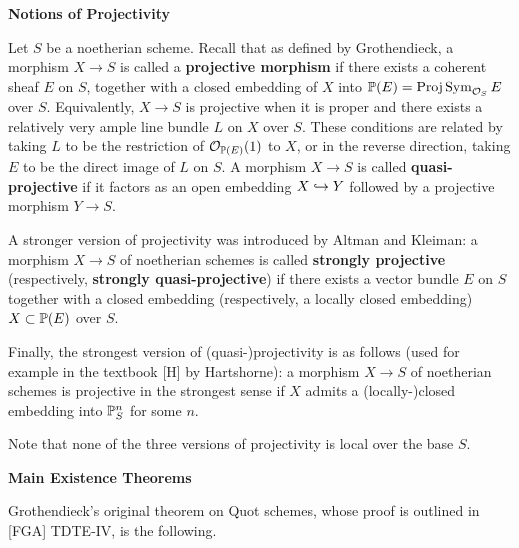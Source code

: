 
\medskip



\centerline{\large\bf Notions of Projectivity}

\medskip


\begin{definition}\label{nhq-projectivity-notions}
Let $S$ be a noetherian scheme. Recall that as defined by Grothendieck,
a morphism $X\to S$ is called a \textbf{projective morphism}
if there exists a coherent sheaf $E$ on $S$, together with a
closed embedding of $X$ into $\mathbb{P}(E) = \operatorname{Proj} \operatorname{Sym}_{{\mathcal O}_S} E $
over $S$. Equivalently, $X\to S$ is projective when
it is proper and there exists a relatively very ample
line bundle $L$ on $X$ over $S$. These conditions are related by
taking $L$ to be the restriction of ${\mathcal O}_{\mathbb{P}(E)}(1)$ to $X$, or
in the reverse direction, taking $E$ to be the direct image of $L$ on $S$.
A morphism $X\to S$ is called \textbf{quasi-projective} if it factors as
an open embedding $X\hookrightarrow Y$ followed by a projective morphism $Y \to S$.


A stronger version of projectivity was introduced
by Altman and Kleiman: a morphism
$X\to S$ of noetherian schemes is called \textbf{strongly projective}
(respectively, \textbf{strongly quasi-projective}) if
there exists a vector bundle $E$ on $S$ together with a closed
embedding (respectively, a locally closed embedding)
$X\subset \mathbb{P}(E)$ over $S$.


Finally, the strongest version of (quasi-)projectivity
is as follows (used for example in
the textbook [H] by Hartshorne): a morphism
$X\to S$ of noetherian schemes is projective in the strongest sense
if $X$ admits a (locally-)closed embedding into $\mathbb{P}^n_S$ for some $n$.

Note that none of the three versions of projectivity
is local over the base $S$.
\end{definition}

\medskip







\bigskip

\newpage

\centerline{\large\bf Main Existence Theorems}


\medskip



Grothendieck's original theorem on Quot schemes,
whose proof is outlined in [FGA] TDTE-IV, is the following.

